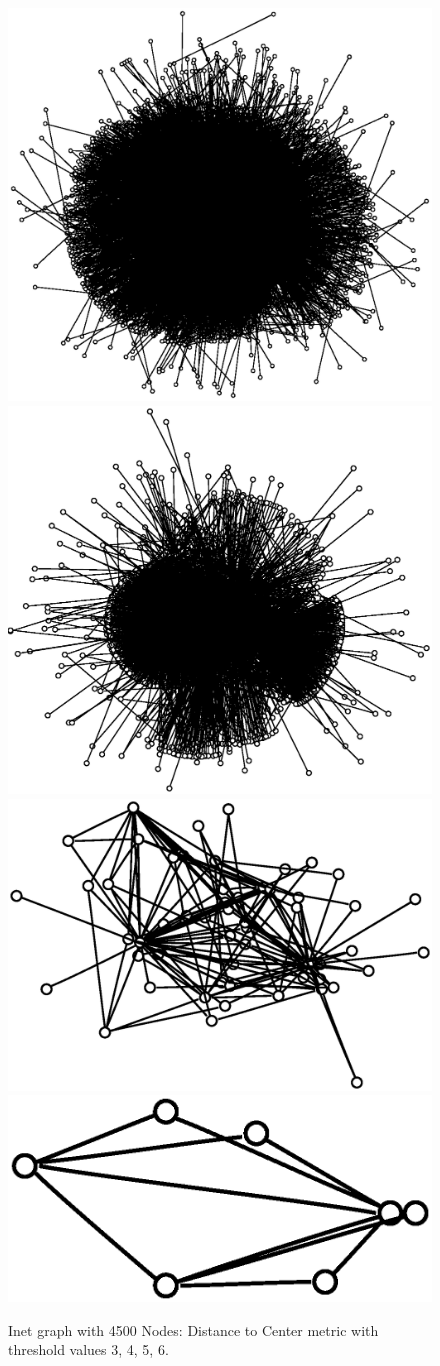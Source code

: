 \begin{figure}
\begin{center}
\vspace{5mm}
\mbox{} \hfill
  \includegraphics[width=0.22\linewidth]{images/inet4500/m10/inet4500_m[10]_t[3].ps}
  \hfill
  \includegraphics[width=0.22\linewidth]{images/inet4500/m10/inet4500_m[10]_t[4].ps}
  \hfill
  \includegraphics[width=0.22\linewidth]{images/inet4500/m10/inet4500_m[10]_t[5].ps}
  \hfill
  \includegraphics[width=0.22\linewidth]{images/inet4500/m10/inet4500_m[10]_t[6].ps}
\hfill \mbox{}
\vspace{-10mm}
  \caption{\label{fig:Inet-center}%
           Inet graph with 4500 Nodes: Distance to Center metric with threshold values 3, 4, 5, 6.}


\end{center}
\end{figure}
